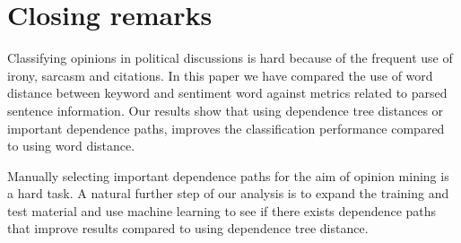 \documentclass[11pt]{article}
\begin{document}
\section{Closing remarks}
\label{sec:cr}

Classifying opinions in political discussions is hard because of the frequent use of irony, sarcasm and citations. In this paper we have compared the use of word distance between keyword and sentiment word against metrics related to parsed sentence information. Our results show that using dependence tree distances or important dependence paths, improves the classification performance compared to using word distance. 

Manually selecting important dependence paths for the aim of opinion mining is a hard task. A natural further step of our analysis is to expand the training and test material and use machine learning to see if there exists dependence paths that improve results compared to using dependence tree distance.


\end{document}
